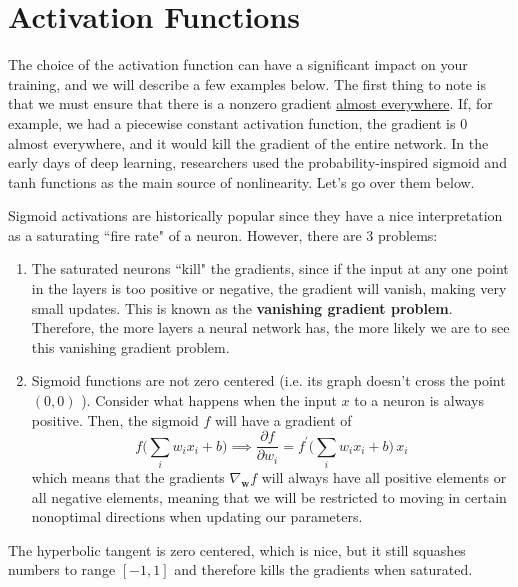 \section{Activation Functions} 

  The choice of the activation function can have a significant impact on your training, and we will describe a few examples below. The first thing to note is that we must ensure that there is a nonzero gradient \hyperref[mt-def:almost_everywhere]{almost everywhere}. If, for example, we had a piecewise constant activation function, the gradient is $0$ almost everywhere, and it would kill the gradient of the entire network. In the early days of deep learning, researchers used the probability-inspired sigmoid and tanh functions as the main source of nonlinearity. Let's go over them below. 

  \begin{definition}[Sigmoid]
    \label{def:sigmoid}
    Sigmoid activations are historically popular since they have a nice interpretation as a saturating ``fire rate" of a neuron. However, there are 3 problems: 
    \begin{enumerate}
      \item The saturated neurons ``kill" the gradients, since if the input at any one point in the layers is too positive or negative, the gradient will vanish, making very small updates. This is known as the \textbf{vanishing gradient problem}. Therefore, the more layers a neural network has, the more likely we are to see this vanishing gradient problem. 
      \item Sigmoid functions are not zero centered (i.e. its graph doesn't cross the point $(0, 0)$ ). Consider what happens when the input $x$ to a neuron is always positive. Then, the sigmoid $f$ will have a gradient of 
      \begin{equation}
        f \bigg( \sum_i w_i x_i + b \bigg) \implies \frac{\partial f}{\partial w_i} = f^\prime \bigg( \sum_i w_i x_i + b \bigg)\, x_i
      \end{equation}
      which means that the gradients $\nabla_\mathbf{w} f$ will always have all positive elements or all negative elements, meaning that we will be restricted to moving in certain nonoptimal directions when updating our parameters. 
    \end{enumerate}
  \end{definition} 

  \begin{definition}
    \label{def:hyperbolic-tangent}
    The hyperbolic tangent is zero centered, which is nice, but it still squashes numbers to range $[-1, 1]$ and therefore kills the gradients when saturated. 
  \end{definition}

